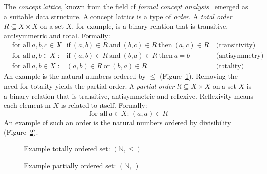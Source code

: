 \documentclass[a4paper, final, diplominf]{zih-template}
\begin{document}
\vspace{1.0ex}
The \emph{concept lattice}, known from the field of \emph{formal concept analysis}~\cite{ganter99} emerged as a suitable data structure.
A concept lattice is a type of \emph{order}.
A \emph{total order} $R \subseteq X \times X$ on a set $X$, for example, is a binary relation that is transitive, antisymmetric and total.
Formally:
\begin{equation*}
	\begin{aligned}
		& \text{for all}~a, b, c \in X & :~ & \text{if}~(a, b) \in R~\text{and}~(b, c) \in R~\text{then}~(a,c) \in R~ & \text{(transitivity)} \\
		& \text{for all}~a, b \in X    & :~ & \text{if}~(a, b) \in R~\text{and}~(b, a) \in R~\text{then}~a = b~ & \text{(antisymmetry)} \\
		& \text{for all}~a, b \in X    & :~ & (a, b) \in R~\text{or}~(b, a) \in R~ & \text{(totality)}
	\end{aligned}
\end{equation*}
An example is the natural numbers ordered by $\le$ (Figure~\ref{fig:total-order-example}).
Removing the need for totality yields the partial order.
A \emph{partial order} $R \subseteq X \times X$ on a set $X$ is a binary relation that is transitive, antisymmetric and reflexive.
Reflexivity means each element in $X$ is related to itself.
Formally:
\vspace{2.0ex}
\begin{equation*}
	\text{for all}~a \in X: ~(a, a) \in R
\end{equation*}
An example of such an order is the natural numbers ordered by divisibility (Figure~\ref{fig:partial-order-example}).
\begin{figure}[tb]
	\centering
	
	\caption{Example totally ordered set: $(\mathbb{N}, \le)$}
	\label{fig:total-order-example}
\end{figure}
\begin{figure}[tb]
	\centering
	
	\caption{Example partially ordered set: $(\mathbb{N}, \mid)$}
	\label{fig:partial-order-example}
\end{figure}
\vspace{1.0ex}
\end{document}
